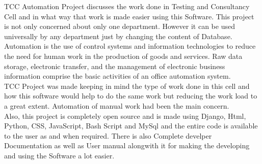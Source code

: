 \begin{Large}
\end{Large}
TCC Automation Project discusses the work done in Testing and Consultancy Cell and in what way that work is made easier using this Software. This project is not only concerned about only one department. However it can be used universally by any department just by changing the content of Database. Automation is the use of control systems and information technologies to reduce the need for human work in the production of goods and services. Raw data storage, electronic transfer, and the management of electronic business information comprise the basic activities of an office automation system. \\

TCC Project was made keeping in mind the type of work done in this cell and how this software would help to do the same work but reducing the work load to a great extent. Automation of manual work had been the main concern.\\

Also, this project is completely open source and is made using Django, Html, Python, CSS, JavaScript, Bash Script and MySql and the entire code is available to the user as and when required. There is also Complete develper Documentation as well as User manual alongwith it for making the developing and using the Software a lot easier.

